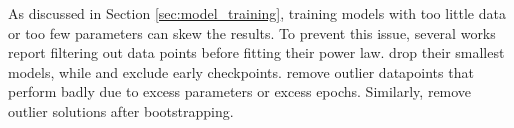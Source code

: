 As discussed in Section \ref{sec:model_training}, training models with too little data or too few parameters can skew the results. To prevent this issue, several works report filtering out data points before fitting their power law. \citet{henighan2020scaling} drop their smallest models, while \citet{hilton2023scaling} and \citet{hoffmann2022training} exclude early checkpoints. \citet{muennighoff2024scaling} remove outlier datapoints that perform badly due to excess parameters or excess epochs. Similarly, \citet{ivgi2022scaling} remove outlier solutions after bootstrapping.
